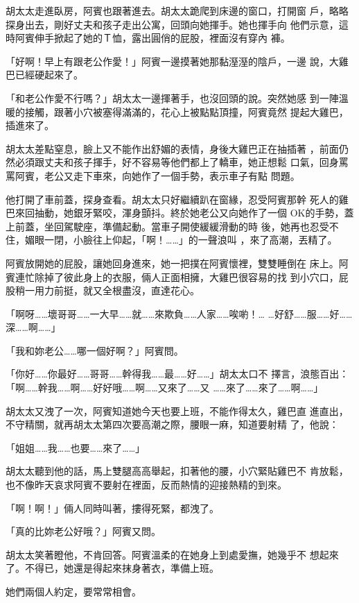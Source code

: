 胡太太走進臥房，阿賓也跟著進去。胡太太跪爬到床邊的窗口，打開窗
戶，略略探身出去，剛好丈夫和孩子走出公寓，回頭向她揮手。她也揮手向
他們示意，這時阿賓伸手掀起了她的Ｔ恤，露出圓俏的屁股，裡面沒有穿內
褲。

「好啊！早上有跟老公作愛！」阿賓一邊摸著她那黏溼溼的陰戶，一邊
說，大雞巴已經硬起來了。

「和老公作愛不行嗎？」胡太太一邊揮著手，也沒回頭的說。突然她感
到一陣溫暖的接觸，跟著小穴被塞得滿滿的，花心上被點點頂撞，阿賓竟然
提起大雞巴，插進來了。

胡太太差點窒息，臉上又不能作出舒媚的表情，身後大雞巴正在抽插著
，前面仍然必須跟丈夫和孩子揮手，好不容易等他們都上了轎車，她正想鬆
口氣，回身罵罵阿賓，老公又走下車來，向她作了一個手勢，表示車子有點
問題。

他打開了車前蓋，探身查看。胡太太只好繼續趴在窗緣，忍受阿賓那幹
死人的雞巴來回抽動，她銀牙緊咬，渾身顫抖。終於她老公又向她作了一個
OK的手勢，蓋上前蓋，坐回駕駛座，準備起動。當車子開使緩緩滑動的時
後，她再也忍受不住，媚眼一閉，小臉往上仰起，「啊！……」的一聲浪叫
，來了高潮，丟精了。

阿賓放開她的屁股，讓她回身進來，她一把撲在阿賓懷裡，雙雙睡倒在
床上。阿賓連忙除掉了彼此身上的衣服，倆人正面相擁，大雞巴很容易的找
到小穴口，屁股稍一用力前挺，就又全根盡沒，直達花心。

「啊呀……壞哥哥……一大早……就……來欺負……人家……唉喲！…
…好舒……服……好……深……啊……」

「我和妳老公……哪一個好啊？」阿賓問。

「你好……你最好……哥哥……幹得我……最……好……」胡太太口不
擇言，浪態百出：「啊……幹我……啊……好好哦……啊……又來了……又
……來了……來了……啊……」

胡太太又洩了一次，阿賓知道她今天也要上班，不能作得太久，雞巴直
進直出，不守精關，就再胡太太第四次要高潮之際，腰眼一麻，知道要射精
了，他說：

「姐姐……我……也要……來了……」

胡太太聽到他的話，馬上雙腿高高舉起，扣著他的腰，小穴緊貼雞巴不
肯放鬆，也不像昨天哀求阿賓不要射在裡面，反而熱情的迎接熱精的到來。

「啊！啊！」倆人同時叫著，摟得死緊，都洩了。

「真的比妳老公好哦？」阿賓又問。

胡太太笑著瞪他，不肯回答。阿賓溫柔的在她身上到處愛撫，她幾乎不
想起來了。不得已，她還是得起來抹身著衣，準備上班。

她們兩個人約定，要常常相會。










